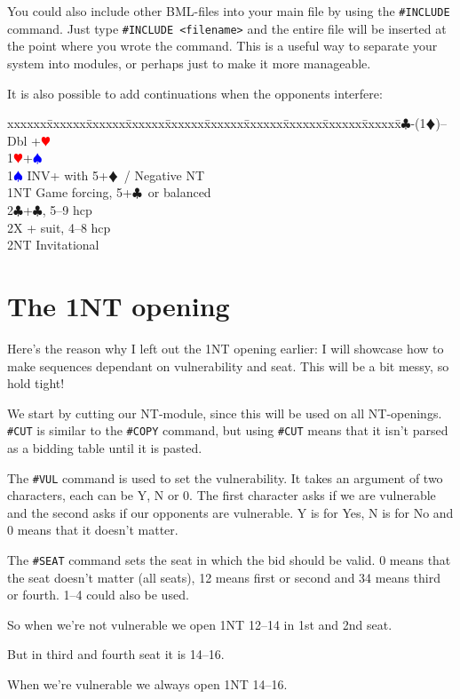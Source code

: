 \documentclass[a4paper]{article}
\newcommand{\BC}{\textcolor{OliveGreen}{$\clubsuit$}}
\newcommand{\BD}{\textcolor{RedOrange}{$\vardiamondsuit$}}
\newcommand{\BH}{\textcolor{Red}{$\varheartsuit${}}}
\newcommand{\BS}{\textcolor{Blue}{$\spadesuit${}}}
\newenvironment{bidtable}
{\begin{tabbing}

xxxxxx\=xxxxxx\=xxxxxx\=xxxxxx\=xxxxxx\=xxxxxx\=xxxxxx\=xxxxxx\=xxxxxx\=xxxxxx\=\kill}
{\end{tabbing} }%
\begin{document}
You could also include other BML-files into your main file by using
the \texttt{\#INCLUDE} command. Just type \texttt{\#INCLUDE <filename>} and the entire
file will be inserted at the point where you wrote the command. This
is a useful way to separate your system into modules, or perhaps
just to make it more manageable.

It is also possible to add continuations when the opponents
interfere:

\begin{bidtable}
1\BC-(1\BD)--\+\\
Dbl +\BH \\
1\BH {}+\BS \\
1\BS \> INV+ with 5+\BD\ / Negative NT\\
1NT \> Game forcing, 5+\BC\ or balanced\\
2\BC {}+\BC , 5--9 hcp\\
2X + suit, 4--8 hcp\\
2NT \> Invitational\-
\end{bidtable}

\section{The 1NT opening}

Here's the reason why I left out the 1NT opening earlier: I will
showcase how to make sequences dependant on vulnerability and
seat. This will be a bit messy, so hold tight!

We start by cutting our NT-module, since this will be used on all
NT-openings. \texttt{\#CUT} is similar to the \texttt{\#COPY} command, but using \texttt{\#CUT}
means that it isn't parsed as a bidding table until it is pasted.

The \texttt{\#VUL} command is used to set the vulnerability. It takes an
argument of two characters, each can be Y, N or 0. The first
character asks if we are vulnerable and the second asks if our
opponents are vulnerable. Y is for Yes, N is for No and 0 means that
it doesn't matter.

The \texttt{\#SEAT} command sets the seat in which the bid should be valid. 0
means that the seat doesn't matter (all seats), 12 means first or
second and 34 means third or fourth. 1--4 could also be used.

So when we're not vulnerable we open 1NT 12--14 in 1st and 2nd seat.

But in third and fourth seat it is 14--16.

When we're vulnerable we always open 1NT 14--16.
\end{document}
